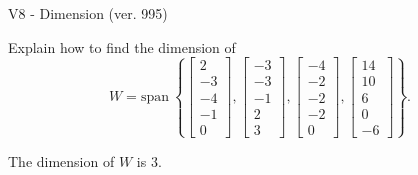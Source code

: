 \begin{exercise}
  \begin{exerciseTitle}V8 - Dimension (ver. 995)\end{exerciseTitle}
  \begin{exerciseStatement}
    Explain how to find the dimension of 
\[W=\mathrm{span}\ \left\{\left[\begin{array}{r}
2 \\
-3 \\
-4 \\
-1 \\
0
\end{array}\right] , \left[\begin{array}{r}
-3 \\
-3 \\
-1 \\
2 \\
3
\end{array}\right] , \left[\begin{array}{r}
-4 \\
-2 \\
-2 \\
-2 \\
0
\end{array}\right] , \left[\begin{array}{r}
14 \\
10 \\
6 \\
0 \\
-6
\end{array}\right]\right\}.\]



  \end{exerciseStatement}
  \begin{exerciseAnswer}
   The dimension of \(W\) is  \(3\).
  


  \end{exerciseAnswer}
\end{exercise}